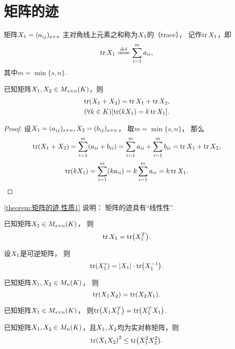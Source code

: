 \section{矩阵的迹}
\begin{definition}
矩阵\(X_1=(a_{ij})_{s \times n}\)
主对角线上元素之和称为\(X_1\)的（trace），
记作\(\tr X_1\)，即\[
	\tr\A \defeq \sum_{i=1}^m a_{ii},
\]
其中\(m = \min\{s,n\}\).
\end{definition}

\begin{property}\label{theorem:矩阵的迹.性质1}
已知矩阵\(X_1,X_2 \in M_{s \times n}(K)\)，则
\begin{gather}
	\tr(X_1+X_2) = \tr X_1 + \tr X_2, \\
	(\forall k \in K)[\tr(k X_1) = k \tr X_1].
\end{gather}
\begin{proof}
设\(X_1=(a_{ij})_{s \times n},
X_2=(b_{ij})_{s \times n}\)，
取\(m = \min\{s,n\}\)，
那么\[
	\tr(X_1+X_2) = \sum_{i=1}^m (a_{ii}+b_{ii})
	= \sum_{i=1}^m a_{ii}
	+ \sum_{i=1}^m b_{ii}
	= \tr X_1 + \tr X_2,
\]\[
	\tr(k X_1) = \sum_{i=1}^m (k a_{ii})
	= k \sum_{i=1}^m a_{ii}
	= k \tr X_1.
	\qedhere
\]
\end{proof}
\end{property}
\cref{theorem:矩阵的迹.性质1} 说明：
矩阵的迹具有“线性性”.

\begin{property}\label{theorem:矩阵的迹.性质2}
已知矩阵\(X_1 \in M_{s \times n}(K)\)，
则\begin{equation}
	\tr X_1 = \tr(X_1^T).
\end{equation}
\end{property}

\begin{property}
设\(X_1\)是可逆矩阵，
则\begin{equation}
	\tr(X_1^*) = \abs{X_1} \cdot \tr(X_1^{-1}).
\end{equation}
\end{property}

\begin{property}\label{theorem:矩阵的迹.矩阵乘积交换次序不变迹}
已知矩阵\(X_1,X_2 \in M_n(K)\)，
则\[
	\tr(X_1X_2) = \tr(X_2X_1).
\]
\end{property}

\begin{property}
已知矩阵\(X_1 \in M_{s \times n}(K)\)，
则\(\tr(X_1X_1^T) = \tr(X_1^TX_1)\).
\end{property}

\begin{property}
已知矩阵\(X_1,X_2 \in M_n(K)\)，且\(X_1,X_2\)均为实对称矩阵，则\[
	\tr(X_1X_2)^2 \leq \tr(X_1^2X_2^2).
\]
\end{property}
